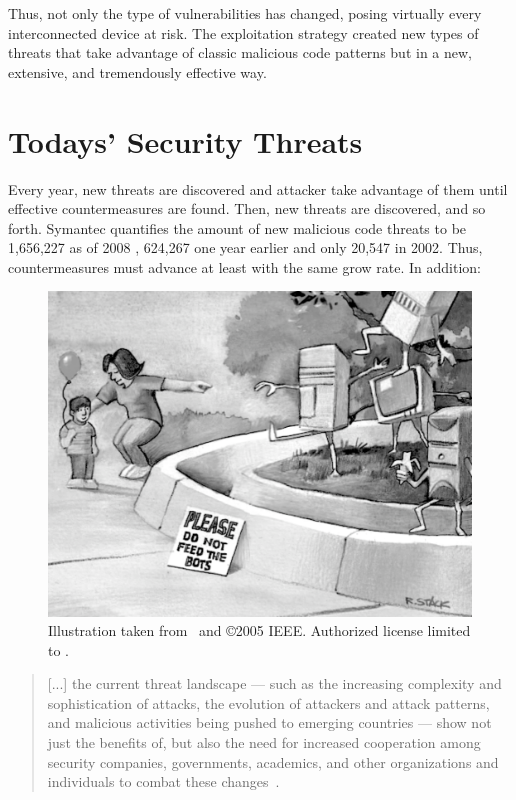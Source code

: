 Thus, not only the type of vulnerabilities has changed, posing
virtually every interconnected device at risk. The exploitation
strategy created new types of threats that take advantage of classic
malicious code patterns but in a new, extensive, and tremendously
effective way.

\section{Todays' Security Threats}
\label{introduction:motivation} Every year, new threats are discovered
and attacker take advantage of them until effective countermeasures
are found. Then, new threats are discovered, and so
forth. \textsf{Symantec} quantifies the amount of new malicious code
threats to be 1,656,227 as of 2008
\citep{symantec_threat_report_2009}, 624,267 one year earlier and only
20,547 in 2002. Thus, countermeasures must advance at least with the
same grow rate. In addition:

\begin{figure}[t]
  \centering
  \includegraphics[width=\textwidth]{figures/intro/bots}
  \caption{Illustration taken from~\citep{holz} and \copyright 2005
  IEEE. Authorized license limited to \polimi.}
  \label{fig:bots}
\end{figure}

\begin{quotation}
  [...] the current threat landscape --- such as the increasing
  complexity and sophistication of attacks, the evolution of attackers
  and attack patterns, and malicious activities being pushed to
  emerging countries --- show not just the benefits of, but also the
  need for increased cooperation among security companies,
  governments, academics, and other organizations and individuals to
  combat these changes~\citep{symantec_threat_report_2009}.
\end{quotation}


